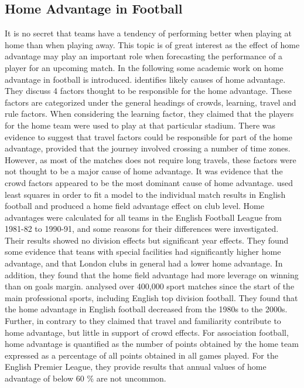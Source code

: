 \subsection{Home Advantage in Football}\label{HomeFieldAdvantage}
It is no secret that teams have a tendency of performing better when playing at home than when playing away. This topic is of great interest as the effect of home advantage may play an important role when forecasting the performance of a player for an upcoming match. In the following some academic work on home advantage in football is introduced.
\newpar
\cite{Nevill} identifies likely causes of home advantage. They discuss 4 factors thought to be responsible for the home advantage. These factors are categorized under the general headings of crowds, learning, travel and rule factors. When considering the learning factor, they claimed that the players for the home team were used to play at that particular stadium. There was evidence to suggest that travel factors could be responsible for part of the home advantage, provided that the journey involved crossing a number of time zones. However, as most of the matches does not require long travels, these factors were not thought to be a major cause of home advantage. It was evidence that the crowd factors appeared to be the most dominant cause of home advantage.
\newpar
\cite{Clarke} used least squares in order to fit a model to the individual match results in English football and produced a home field advantage effect on club level. Home advantages were calculated for all teams in the English Football League from 1981-82 to 1990-91, and some reasons for their differences were investigated. Their results showed no division effects but significant year effects. They found some evidence that teans with special facilities had significantly higher home advantage, and that London clubs in general had a lower home advantage. In addition, they found that the home field advantage had more leverage on winning than on goals margin. 
\newpar
\cite{Pollard} analysed over 400,000 sport matches since the start of the main professional sports, including English top division football. They found that the home advantage in English football decreased from the 1980s to the 2000s. Further, in contrary to \cite{Nevill} they claimed that travel and familiarity contribute to home advantage, but little in support of crowd effects. For association football, \cite{Pollard} home advantage is quantified as the number of points obtained by the home team expressed as a percentage of all points obtained in all games played. For the English Premier League, they provide results that annual values of home advantage of below 60 \% are not uncommon. 
\newpar

